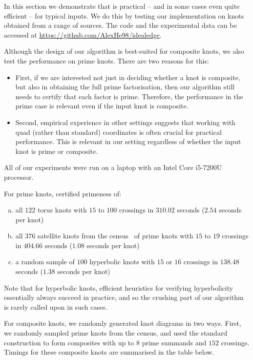 \documentclass[a4paper,UKenglish,cleveref, autoref, thm-restate]{lipics-v2021}
\begin{document}
In this section we demonstrate that 
is practical -- and in some cases even quite efficient -- for typical inputs.
We do this by testing our implementation on knots obtained from a range of sources.
The code and the experimental data can be accessed at \url{https://github.com/AlexHe98/idealedge}.

Although the design of our algorithm is best-suited for composite knots, we also test the performance on prime knots.
There are two reasons for this:
\begin{itemize}
\item
First, if we are interested not just in deciding whether a knot is composite, but also in obtaining the full prime factorisation, then our algorithm still needs to certify that each factor is prime.
Therefore, the performance in the prime case is relevant even if the input knot is composite.
\item
Second, empirical experience in other settings suggests that working with quad (rather than standard) coordinates is often crucial for practical performance.
This is relevant in our setting regardless of whether the input knot is prime or composite.
\end{itemize}
All of our experiments were run on a laptop with an Intel Core i5-7200U processor.

For prime knots,  certified primeness of:
\begin{enumerate}[(a)]
\item
all $122$ torus knots with $15$ to $100$ crossings in $310.02$ seconds ($2.54$ seconds per knot)
\item
all $376$ satellite knots from the census~\cite{burton2020knots} of prime knots with $15$ to $19$ crossings in $404.66$ seconds ($1.08$ seconds per knot)
\item
a random sample of $100$ hyperbolic knots with $15$ or $16$ crossings in $138.48$ seconds ($1.38$ seconds per knot)
\end{enumerate}
Note that for hyperbolic knots, efficient heuristics for verifying hyperbolicity essentially always succeed in practice, and so the crushing part of our algorithm is rarely called upon in such cases.

For composite knots, we randomly generated knot diagrams in two ways.
First, we randomly sampled prime knots from the census, and used the standard construction to form composites with up to $8$ prime summands and $152$ crossings.
Timings for these composite knots are summarised in the table below.
\end{document}
